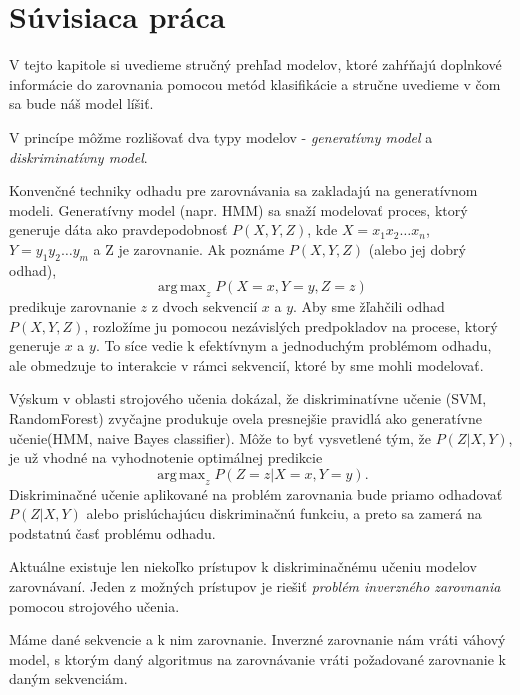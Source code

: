\chapter{Súvisiaca práca}

V tejto kapitole si uvedieme stručný prehľad modelov, ktoré zahŕňajú doplnkové informácie do zarovnania pomocou metód klasifikácie a stručne uvedieme v čom sa bude náš model líšiť.

V princípe môžme rozlišovať dva typy modelov - \textit{generatívny model} a \textit{diskriminatívny model}.

Konvenčné techniky odhadu pre zarovnávania sa zakladajú na generatívnom modeli. Generatívny model (napr. HMM) sa snaží modelovať proces, ktorý generuje dáta ako pravdepodobnosť $P(X,Y,Z)$, kde $X = x_1x_2\dots x_n$, $Y = y_1y_2\dots y_m$ a Z je zarovnanie. Ak poznáme $P(X,Y,Z)$ (alebo jej dobrý odhad),
$$\operatorname{arg\,max}_z P(X = x,Y = y,Z = z)$$
predikuje zarovnanie $z$ z dvoch sekvencií $x$ a $y$. Aby sme žľahčili odhad $P(X,Y,Z)$, rozložíme ju pomocou nezávislých predpokladov na procese, ktorý generuje $x$ a $y$. To síce vedie k efektívnym a jednoduchým problémom odhadu, ale obmedzuje to interakcie v rámci sekvencií, ktoré by sme mohli modelovať. \cite{svmTrainingProteinsAlignment}

Výskum v oblasti strojového učenia dokázal, že diskriminatívne učenie (SVM, RandomForest) zvyčajne produkuje ovela presnejšie pravidlá ako generatívne učenie(HMM, naive Bayes classifier).
Môže to byť vysvetlené tým, že $P(Z|X,Y)$, je už vhodné na vyhodnotenie optimálnej predikcie
$$\operatorname{arg\,max}_z P(Z = z|X = x,Y = y).$$
Diskriminačné učenie aplikované na problém zarovnania bude priamo odhadovať $P(Z|X,Y)$ alebo prislúchajúcu diskriminačnú funkciu, a preto sa zamerá na podstatnú časť problému odhadu. \cite{svmTrainingProteinsAlignment}

Aktuálne existuje len niekoľko prístupov k diskriminačnému učeniu modelov zarovnávaní. 
Jeden z možných prístupov je riešiť \textit{problém inverzného zarovnania} pomocou strojového učenia. \cite{svmTrainingProteinsAlignment}

\begin{df}
Máme dané sekvencie a k nim zarovnanie. Inverzné zarovnanie nám vráti váhový model, s ktorým daný algoritmus na zarovnávanie vráti požadované zarovnanie k daným sekvenciám.
\end{df}

